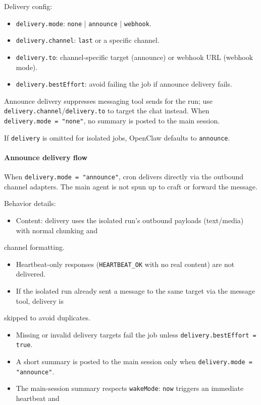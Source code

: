 Delivery config:

\begin{itemize}
  \item \texttt{delivery.mode}: \texttt{none} | \texttt{announce} | \texttt{webhook}.
  \item \texttt{delivery.channel}: \texttt{last} or a specific channel.
  \item \texttt{delivery.to}: channel-specific target (announce) or webhook URL (webhook mode).
  \item \texttt{delivery.bestEffort}: avoid failing the job if announce delivery fails.
\end{itemize}


Announce delivery suppresses messaging tool sends for the run; use \texttt{delivery.channel}/\texttt{delivery.to}
to target the chat instead. When \texttt{delivery.mode = "none"}, no summary is posted to the main session.

If \texttt{delivery} is omitted for isolated jobs, OpenClaw defaults to \texttt{announce}.

\paragraph{Announce delivery flow}


When \texttt{delivery.mode = "announce"}, cron delivers directly via the outbound channel adapters.
The main agent is not spun up to craft or forward the message.

Behavior details:

\begin{itemize}
  \item Content: delivery uses the isolated run's outbound payloads (text/media) with normal chunking and
\end{itemize}

channel formatting.
\begin{itemize}
  \item Heartbeat-only responses (\texttt{HEARTBEAT\_OK} with no real content) are not delivered.
  \item If the isolated run already sent a message to the same target via the message tool, delivery is
\end{itemize}

skipped to avoid duplicates.
\begin{itemize}
  \item Missing or invalid delivery targets fail the job unless \texttt{delivery.bestEffort = true}.
  \item A short summary is posted to the main session only when \texttt{delivery.mode = "announce"}.
  \item The main-session summary respects \texttt{wakeMode}: \texttt{now} triggers an immediate heartbeat and
\end{itemize}

